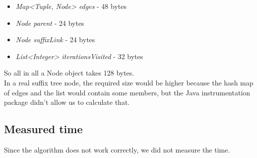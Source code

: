 \documentclass[a4paper,10pt]{article}
\begin{document}
\begin{itemize}
	\item \emph{Map{\textless}Tuple, Node{\textgreater} edges} - 48 bytes
	\item \emph{Node parent} - 24 bytes
	\item \emph{Node suffixLink} - 24 bytes
	\item \emph{List{\textless}Integer{\textgreater} iterationsVisited} - 32 bytes
\end{itemize}

So all in all a Node object takes 128 bytes.\\
In a real suffix tree node, the required size would be higher because the hash map of edges and the list would contain some members, but the Java instrumentation package didn't allow us to calculate that.

\subsection*{Measured time}

Since the algorithm does not work correctly, we did not measure the time.
\end{document}
